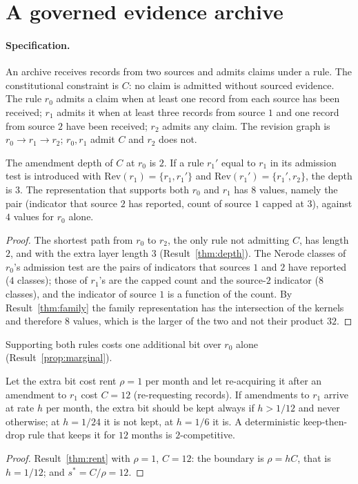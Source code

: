 \section{A governed evidence archive}

\paragraph{Specification.} An archive receives records from two sources and admits claims under a rule. The constitutional constraint is $C$: no claim is admitted without sourced evidence. The rule $r_0$ admits a claim when at least one record from each source has been received; $r_1$ admits it when at least three records from source $1$ and one record from source $2$ have been received; $r_2$ admits any claim. The revision graph is $r_0\to r_1\to r_2$; $r_0,r_1$ admit $C$ and $r_2$ does not.

\begin{newresult}\label{prop:archive-depth}
The amendment depth of $C$ at $r_0$ is $2$. If a rule $r_1'$ equal to $r_1$ in its admission test is introduced with $\mathrm{Rev}(r_1)=\{r_1,r_1'\}$ and $\mathrm{Rev}(r_1')=\{r_1',r_2\}$, the depth is $3$. The representation that supports both $r_0$ and $r_1$ has $8$ values, namely the pair (indicator that source $2$ has reported, count of source $1$ capped at $3$), against $4$ values for $r_0$ alone.
\end{newresult}
\begin{proof}
The shortest path from $r_0$ to $r_2$, the only rule not admitting $C$, has length $2$, and with the extra layer length $3$ (Result~\ref{thm:depth}). The Nerode classes of $r_0$'s admission test are the pairs of indicators that sources $1$ and $2$ have reported ($4$ classes); those of $r_1$'s are the capped count and the source-$2$ indicator ($8$ classes), and the indicator of source $1$ is a function of the count. By Result~\ref{thm:family} the family representation has the intersection of the kernels and therefore $8$ values, which is the larger of the two and not their product $32$.
\end{proof}

Supporting both rules costs one additional bit over $r_0$ alone (Result~\ref{prop:marginal}).

\begin{newresult}\label{prop:archive-rent}
Let the extra bit cost rent $\rho=1$ per month and let re-acquiring it after an amendment to $r_1$ cost $C=12$ (re-requesting records). If amendments to $r_1$ arrive at rate $h$ per month, the extra bit should be kept always if $h>1/12$ and never otherwise; at $h=1/24$ it is not kept, at $h=1/6$ it is. A deterministic keep-then-drop rule that keeps it for $12$ months is $2$-competitive.
\end{newresult}
\begin{proof}
Result~\ref{thm:rent} with $\rho=1$, $C=12$: the boundary is $\rho=hC$, that is $h=1/12$; and $s^*=C/\rho=12$.
\end{proof}

